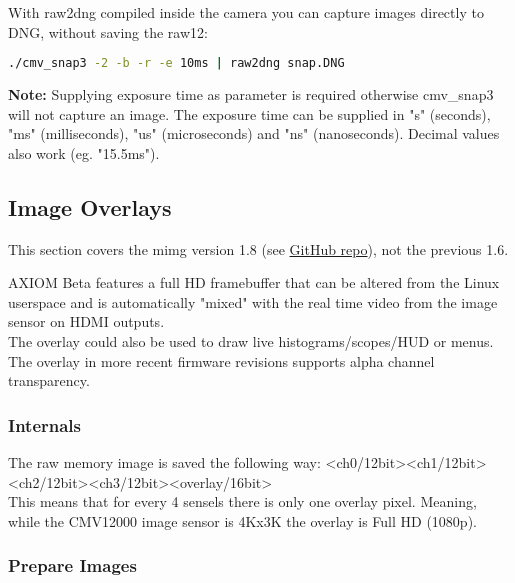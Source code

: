 With raw2dng compiled inside the camera you can capture images directly to DNG, without saving the raw12: 


\begin{lstlisting}[language=bash,morekeywords=$,keywordstyle=\bfseries,frame=none,xleftmargin=.25in,belowskip=2em, aboveskip=2em]
./cmv_snap3 -2 -b -r -e 10ms | raw2dng snap.DNG
\end{lstlisting} 


\textbf{Note:} Supplying exposure time as parameter is required otherwise cmv_snap3 will not capture an image. The exposure time can be supplied in "s" (seconds), "ms" (milliseconds), "us" (microseconds) and "ns" (nanoseconds). Decimal values also work (eg. "15.5ms"). 


\subsection{Image Overlays}

This section covers the mimg version 1.8 (see \href{https://github.com/apertus-open-source-cinema/beta-software/tree/master/mimg}{GitHub repo}), not the previous 1.6. 

AXIOM Beta features a full HD framebuffer that can be altered from the Linux userspace and is automatically "mixed" with the real time video from the image sensor on HDMI outputs.\\

The overlay could also be used to draw live histograms/scopes/HUD or menus.\\

The overlay in more recent firmware revisions supports alpha channel transparency. \\


\subsubsection{Internals}


The raw memory image is saved the following way: <ch0/12bit><ch1/12bit><ch2/12bit><ch3/12bit><overlay/16bit> \\

This means that for every 4 sensels there is only one overlay pixel. Meaning, while the CMV12000 image sensor is 4Kx3K the overlay is Full HD (1080p). 


\subsubsection{Prepare Images}

